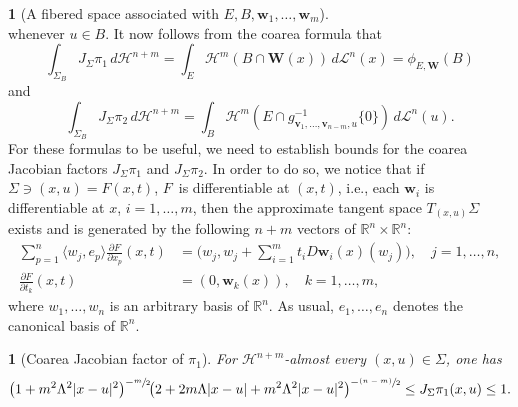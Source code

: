\documentclass[11pt]{article}
\newcommand{\ie}{i.e.,\xspace}
\newcounter{cdrthm}[section]
\theoremstyle{definition}
\theoremstyle{jepanonymous}
\newtheorem{jepempty}[cdrthm]{}
\newenvironment{enonce}[2][remark]{\begin{jepempty}[#2]}{\end{jepempty}}
\theoremstyle{plain}
\newcommand{\psfrac}[2]{\sfrac{(#1)}{#2}}
\newenvironment{Empty}[2][\null]{%
\begin{enonce}[remark]{#1}#2}
{\end{enonce}}
\newcommand{\R}{\mathbb{R}}
\newcommand{\Rn}{\R^n}
\newcommand{\calH}{\mathscr{H}}
\newcommand{\calL}{\mathscr{L}}
\newcommand{\bW}{{\boldsymbol{W}}}
\newcommand{\bv}{{\boldsymbol{v}}}
\newcommand{\bw}{{\boldsymbol{w}}}
\let\la\langle
\let\ra\rangle
\begin{document}
\begin{Empty}[A fibered space associated with $E,B,\bw_1,\ldots,\bw_m$]
\begin{equation}
\end{equation}
whenever $u \in B$.
It now follows from the coarea formula that
\begin{equation}
\label{eq.9}
\int_{\Sigma_B} J_\Sigma \pi_1 \,d\calH^{n+m} = \int_E \calH^m(B \cap \bW(x)) \,d\calL^n(x) = \phi_{E,\bW}(B)
\end{equation}
and
\begin{equation}
\label{eq.10}
\int_{\Sigma_B} J_\Sigma \pi_2 \,d\calH^{n+m} = \int_B \calH^m(E \cap g_{\bv_1,\ldots,\bv_{n-m},u}^{-1}\{0\}) \,d\calL^n(u).
\end{equation}
For these formulas to be useful, we need to establish bounds for the coarea Jacobian factors $J_\Sigma \pi_1$ and $J_\Sigma \pi_2$.
In order to do so, we notice that if $\Sigma \ni (x,u) = F(x,t)$, $F$~is differentiable at $(x,t)$, \ie each $\bw_i$ is differentiable at $x$, $i=1,\ldots,m$, then the approximate tangent space $T_{(x,u)}\Sigma$ exists and is generated by the following $n+m$ vectors of $\Rn \times \Rn$:
\begin{equation*}
\begin{split}
\sum_{p=1}^n \la w_j, e_p \ra \frac{\partial F}{\partial x_p}(x,t) & = \biggl(w_j, w_j +\sum_{i=1}^m t_i D \bw_i(x)(w_j) \biggr), \quad j=1,\ldots,n, \\
\frac{\partial F}{\partial t_k}(x,t) & =(0, \bw_k(x)), \quad k=1,\ldots,m,
\end{split}
\end{equation*}
where $w_1,\ldots,w_n$ is an arbitrary basis of $\Rn$.
As usual, $e_1,\ldots,e_n$ denotes the canonical basis of $\Rn$.
\end{Empty}

\begin{Empty}[Coarea Jacobian factor of $\pi_1$]
\label{factor.pi.1}
{\it
For $\calH^{n+m}$-almost every $(x,u) \in \Sigma$, one has
\begin{equation*}
\bigl(1 + m^2 \Lambda^2 |x-u|^2\bigr)^{-\sfrac{m}{2}}\!\bigl(2 + 2m\Lambda |x-u| + m^2\Lambda^2 |x-u|^2 \bigr)^{-\psfrac{n-m}{2}}
\leq J_\Sigma \pi_1(x,u) \leq 1.
\end{equation*}
}
\end{Empty}
\end{document}
